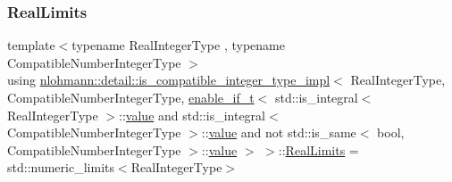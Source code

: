 \subsubsection{\texorpdfstring{RealLimits}{RealLimits}}
{\footnotesize\ttfamily template$<$typename Real\+Integer\+Type , typename Compatible\+Number\+Integer\+Type $>$ \\
using \mbox{\hyperlink{structnlohmann_1_1detail_1_1is__compatible__integer__type__impl}{nlohmann\+::detail\+::is\+\_\+compatible\+\_\+integer\+\_\+type\+\_\+impl}}$<$ Real\+Integer\+Type, Compatible\+Number\+Integer\+Type, \mbox{\hyperlink{namespacenlohmann_1_1detail_a02bcbc878bee413f25b985ada771aa9c}{enable\+\_\+if\+\_\+t}}$<$ std\+::is\+\_\+integral$<$ Real\+Integer\+Type $>$\+::\mbox{\hyperlink{structnlohmann_1_1detail_1_1is__compatible__integer__type__impl_3_01_real_integer_type_00_01_com5aa74bcf254245a639da00509f4d2655_a478242daac7a70e28c749bfec00d1c1b}{value}} and std\+::is\+\_\+integral$<$ Compatible\+Number\+Integer\+Type $>$\+::\mbox{\hyperlink{structnlohmann_1_1detail_1_1is__compatible__integer__type__impl_3_01_real_integer_type_00_01_com5aa74bcf254245a639da00509f4d2655_a478242daac7a70e28c749bfec00d1c1b}{value}} and not std\+::is\+\_\+same$<$ bool, Compatible\+Number\+Integer\+Type $>$\+::\mbox{\hyperlink{structnlohmann_1_1detail_1_1is__compatible__integer__type__impl_3_01_real_integer_type_00_01_com5aa74bcf254245a639da00509f4d2655_a478242daac7a70e28c749bfec00d1c1b}{value}} $>$ $>$\+::\mbox{\hyperlink{structnlohmann_1_1detail_1_1is__compatible__integer__type__impl_3_01_real_integer_type_00_01_com5aa74bcf254245a639da00509f4d2655_a0e9f2586c4de25750563770c9388ab9f}{Real\+Limits}} =  std\+::numeric\+\_\+limits$<$Real\+Integer\+Type$>$}



